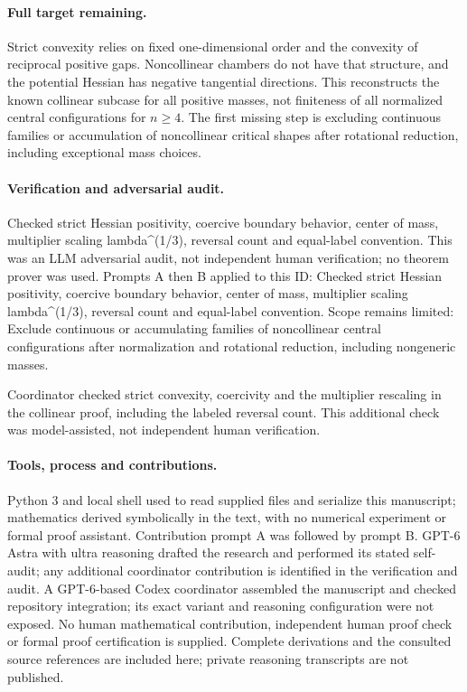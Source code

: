 \documentclass[11pt]{article}
\begin{document}
\paragraph{Full target remaining.}Strict convexity relies on fixed one-dimensional order and the convexity of reciprocal positive gaps. Noncollinear chambers do not have that structure, and the potential Hessian has negative tangential directions. This reconstructs the known collinear subcase for all positive masses, not finiteness of all normalized central configurations for \(n\ge4\). The first missing step is excluding continuous families or accumulation of noncollinear critical shapes after rotational reduction, including exceptional mass choices.

\paragraph{Verification and adversarial audit.}
Checked strict Hessian positivity, coercive boundary behavior, center of mass, multiplier scaling lambda\textasciicircum{}(1/3), reversal count and equal-label convention. This was an LLM adversarial audit, not independent human verification; no theorem prover was used. Prompts A then B applied to this ID: Checked strict Hessian positivity, coercive boundary behavior, center of mass, multiplier scaling lambda\textasciicircum{}(1/3), reversal count and equal-label convention. Scope remains limited: Exclude continuous or accumulating families of noncollinear central configurations after normalization and rotational reduction, including nongeneric masses.

Coordinator checked strict convexity, coercivity and the multiplier rescaling in the collinear proof, including the labeled reversal count. This additional check was model-assisted, not independent human verification.

\paragraph{Tools, process and contributions.}
Python 3 and local shell used to read supplied files and serialize this manuscript; mathematics derived symbolically in the text, with no numerical experiment or formal proof assistant. Contribution prompt A was followed by prompt B. GPT-6 Astra with ultra reasoning drafted the research and performed its stated self-audit; any additional coordinator contribution is identified in the verification and audit. A GPT-6-based Codex coordinator assembled the manuscript and checked repository integration; its exact variant and reasoning configuration were not exposed. No human mathematical contribution, independent human proof check or formal proof certification is supplied. Complete derivations and the consulted source references are included here; private reasoning transcripts are not published.
\end{document}
